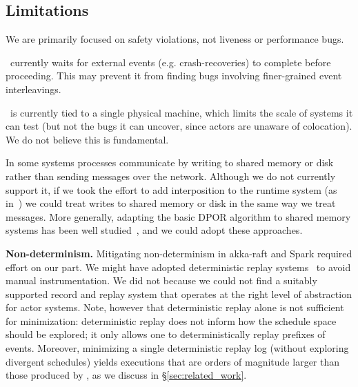 


\subsection{Limitations}

 We
are primarily focused on safety violations, not liveness or performance bugs.

 \sys~currently waits for external
events (e.g. crash-recoveries) to complete before proceeding. This may prevent it from finding
bugs involving finer-grained event interleavings.

 \sys~is currently tied to a
single physical machine, which limits the scale of systems it can test (but
not the bugs it can uncover, since actors are unaware of colocation). We do not
believe this is fundamental.

 In some systems processes communicate
by writing to
shared memory or disk rather than sending messages over the network.
Although we do not currently support it, if we took the effort to add interposition to the
runtime system (as in~\cite{tallam2007enabling}) we could treat writes to shared memory or
disk in the same way we treat messages. More generally, adapting the
basic DPOR algorithm to shared memory systems has been well
studied~\cite{yabandeh2009dpor,flanagan2005dynamic}, and we could adopt these approaches.

\noindent\textbf{Non-determinism.} Mitigating non-determinism in akka-raft and
Spark required effort on our part. We might have adopted deterministic replay
systems~\cite{Dunlap:2002:REI:844128.844148,Geels:2006:RDD:1267359.1267386,lin2013defined,Zamfir:2010:EST:1755913.1755946}
to avoid manual instrumentation. We did not because we could not
find a suitably supported record and replay system that operates at the right
level of abstraction for actor systems.
Note, however that
deterministic replay alone is not sufficient for minimization:
deterministic replay does not inform how the schedule space should be
explored; it only allows one to deterministically replay prefixes of events.
Moreover, minimizing a single deterministic replay log (without exploring divergent
schedules) yields executions that are orders of magnitude larger
than those produced by \sys, as we discuss in
\S\ref{sec:related_work}.

